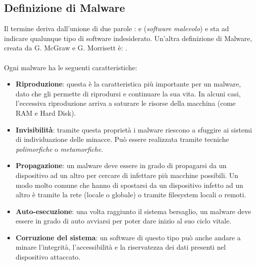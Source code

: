 \subsection{Definizione di Malware}
Il termine  deriva dall'unione di due parole \cite{malware}:  e  (\textit{software malevolo}) e sta ad indicare qualunque tipo di software indesiderato. Un'altra definizione di Malware, creata da G. McGraw e G. Morrisett \cite{malware} è: .\\
\\
Ogni malware ha le seguenti caratteristiche:

\begin{itemize}
    \item \textbf{Riproduzione}: questa è la caratteristica più importante per un malware, dato che gli permette di riprodursi e continuare la sua vita. In alcuni casi, l'eccessiva riproduzione arriva a saturare le risorse della macchina (come RAM e Hard Disk).
    
    \item \textbf{Invisibilità}: tramite questa proprietà i malware riescono a sfuggire ai sistemi di individuazione delle minacce. Può essere realizzata tramite tecniche \textit{polimorfiche} o \textit{metamorfiche}. %
    
    \item \textbf{Propagazione}: un malware deve essere in grado di propagarsi da un dispositivo ad un altro per cercare di infettare più macchine possibili. Un modo molto comune che hanno di spostarsi da un dispositivo infetto ad un altro è tramite la rete (locale o globale) o tramite filesystem locali o remoti.
    
    \item \textbf{Auto-esecuzione}: una volta raggiunto il sistema bersaglio, un malware deve essere in grado di auto avviarsi per poter dare inizio al suo ciclo vitale.
    
    \item \textbf{Corruzione del sistema}: un software di questo tipo può anche andare a minare l'integrità, l'accessibilità e la riservatezza dei dati presenti nel dispositivo attaccato.
\end{itemize}

